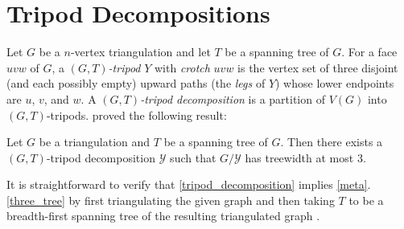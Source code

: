 \documentclass{patmorin}
\begin{document}
%

\section{Tripod Decompositions}
\label{tripod_decompositions}

Let $G$ be a $n$-vertex triangulation and let $T$ be a spanning tree of $G$. For a face $uvw$ of $G$, a \emph{$(G,T)$-tripod} $Y$ with \emph{crotch} $uvw$ is the vertex set of three disjoint (and each possibly empty) upward paths (the \emph{legs} of $Y$) whose lower endpoints are $u$, $v$, and $w$.  A \emph{$(G,T)$-tripod decomposition} is a partition of $V(G)$ into $(G,T)$-tripods.  \citet{dujmovic.joret.ea:planar} proved the following result:

\begin{thm}\label{tripod_decomposition}
  Let $G$ be a triangulation and $T$ be a spanning tree of $G$.  Then there exists a $(G,T)$-tripod decomposition $\mathcal{Y}$ such that $G/\mathcal{Y}$ has treewidth at most $3$.
\end{thm}

It is straightforward to verify that \cref{tripod_decomposition} implies \cref{meta}.\ref{three_tree} by first triangulating the given graph and then taking $T$ to be a breadth-first spanning tree of the resulting triangulated graph \cite[Observation~35]{dujmovic.joret.ea:planar}.
\end{document}
